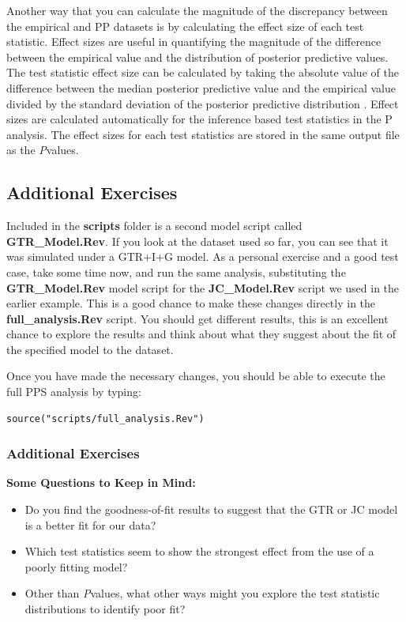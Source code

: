 \begin{equation *}
\begin{equation *}
\begin{equation *}
Another way that you can calculate the magnitude of the discrepancy between the empirical and PP datasets is by
calculating the effect size of each test statistic. Effect sizes are useful in quantifying the magnitude of the difference between the 
empirical value and the distribution of posterior predictive values. The test statistic effect size can be calculated by taking the 
absolute value of the difference between the median posterior predictive value and the empirical value divided by 
the standard deviation of the posterior predictive distribution \citep{Doyle2015-qb}. Effect sizes are calculated automatically for the inference based test statistics in the P analysis. The effect sizes for each test statistics are stored in the same output file as the \textit{P}\-values. 

\subsection{Additional Exercises}

Included in the \textbf{scripts} folder is a second model script called \textbf{GTR\_Model.Rev}. 
If you look at the dataset used so far, you can see that it was simulated under a GTR+I+G model. 
As a personal exercise and a good test case, take some time now, and run the same analysis, substituting
the \textbf{GTR\_Model.Rev} model script for the \textbf{JC\_Model.Rev} script we used in the earlier example.
This is a good chance to make these changes directly in the \textbf{full\_analysis.Rev} script.  
You should get different results, this is an excellent chance to explore the results and think about what
they suggest about the fit of the specified model to the dataset. 

Once you have made the necessary changes, you should be able to execute the full PPS analysis by typing:

{\tt \begin{Snugshade}[184,207,236]
\begin{lstlisting}  
source("scripts/full_analysis.Rev")
\end{lstlisting}
\end{Snugshade}}

\newpage
\subsubsection{Additional Exercises}
\textbf{Some Questions to Keep in Mind:}
\begin{itemize}
  \item Do you find the goodness-of-fit results to suggest that the GTR or JC model is a better fit for our data? 
  \item Which test statistics seem to show the strongest effect from the use of a poorly fitting model?
  \item Other than \textit{P}\-values, what other ways might you explore the test statistic distributions to identify poor fit?
\end{itemize}


\end{equation *}
\end{equation *}
\end{equation *}
